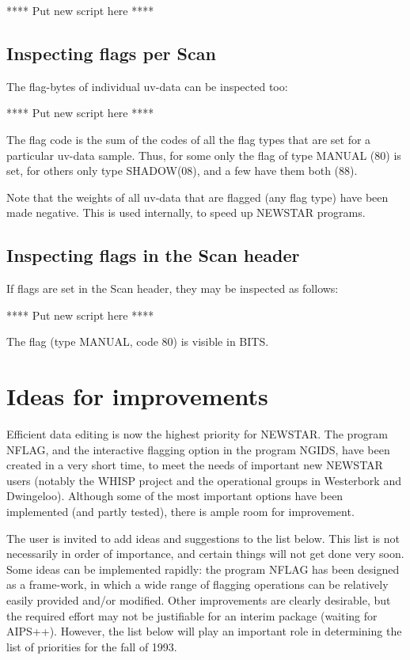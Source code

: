**** Put new script here ****


\subsection{Inspecting flags per Scan}
\label{.show-scan}

The flag-bytes of individual uv-data can be inspected too:

**** Put new script here ****

The flag code is the sum of the codes of all the flag types that are set
for a particular uv-data sample. Thus, for some only the flag of type
MANUAL (80) is set, for others only type SHADOW(08), and a few have
them both (88).

Note that the weights of all uv-data that are flagged (any flag type) have
been made negative. This is used internally, to speed up NEWSTAR programs.

\subsection{Inspecting flags in the Scan header}
\label{.show-header}


If flags are set in the Scan header, they may be inspected as follows:

**** Put new script here ****

The flag (type MANUAL, code 80) is visible in BITS.


\newpage
\section{Ideas for improvements}
\label{.improve}

Efficient data editing is now the highest priority for NEWSTAR. The program
NFLAG, and the interactive flagging option in the program NGIDS, have been
created in a very short time, to meet the needs of important new NEWSTAR users
(notably the WHISP project and the operational groups in Westerbork and
Dwingeloo). Although some of the most important options have been implemented
(and partly tested), there is ample room for improvement.

The user is invited to add ideas and suggestions to the list below. This list
is not necessarily in order of importance, and certain things will not get done
very soon. Some ideas can be implemented rapidly: the program NFLAG has been
designed as a frame-work, in which a wide range of flagging operations can be
relatively easily provided and/or modified. Other improvements are clearly
desirable, but the required effort may not be justifiable for an interim
package (waiting for AIPS++). However, the list below will play an important
role in determining the list of priorities for the fall of 1993.


